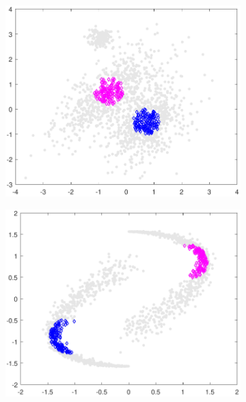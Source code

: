 \documentclass[preprint,12pt]{elsarticle}
\begin{document}
\begin{figure}[!htb]
		\begin{subfigure}[b]{0.40\linewidth}
			\centering\includegraphics[width=1\linewidth]{figures/normdatamodel_sm.pdf}
			\caption{\label{fig:dmodel2}} 
		\end{subfigure} 
		\begin{subfigure}[b]{0.40\linewidth}
			\centering\includegraphics[width=1\linewidth]{figures/yydatamodel_sm.pdf}
			\caption{\label{fig:spatialmedc2}}
		\end{subfigure} \\
		

\end{figure}
\end{document}
